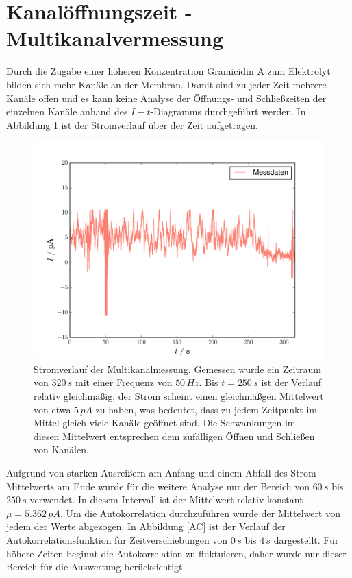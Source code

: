 \documentclass{include/thesisclass3}
\newcommand{\e}[1]{\,\si{#1}}
\begin{document}
\section{Kanalöffnungszeit - Multikanalvermessung}
Durch die Zugabe einer höheren Konzentration Gramicidin A zum Elektrolyt bilden sich mehr Kanäle an der Membran. Damit sind zu jeder Zeit mehrere Kanäle offen und es kann keine Analyse der Öffnungs- und Schließzeiten der einzelnen Kanäle anhand des $I-t$-Diagramms durchgeführt werden. In Abbildung \ref{multi} ist der Stromverlauf über der Zeit aufgetragen.
\begin{figure}[H]
\centering
\includegraphics[scale=0.7]{images/multi.pdf}
\caption{Stromverlauf der Multikanalmessung. Gemessen wurde ein Zeitraum von $320\e{s}$ mit einer Frequenz von $50\e{Hz}$. Bis $t = 250\e{s}$ ist der Verlauf relativ gleichmäßig; der Strom scheint einen gleichmäßgen Mittelwert von etwa $5\e{pA}$ zu haben, was bedeutet, dass zu jedem Zeitpunkt im Mittel gleich viele Kanäle geöffnet sind. Die Schwankungen im diesen Mittelwert entsprechen dem zufälligen Öffnen und Schließen von Kanälen.}
\label{multi}
\end{figure}
Aufgrund von starken Ausreißern am Anfang und einem Abfall des Strom-Mittelwerts am Ende wurde für die weitere Analyse nur der Bereich von $60\e{s}$ bis $250\e{s}$ verwendet. In diesem Intervall ist der Mittelwert relativ konstant $\mu = 5.362\e{pA}$. Um die Autokorrelation durchzuführen wurde der Mittelwert von jedem der Werte abgezogen. In Abbildung \ref{AC} ist der Verlauf der Autokorrelationsfunktion für Zeitverschiebungen von $0\e{s}$ bis $4\e{s}$ dargestellt. Für höhere Zeiten beginnt die Autokorrelation zu fluktuieren, daher wurde nur dieser Bereich für die Auswertung berücksichtigt.
\end{document}

